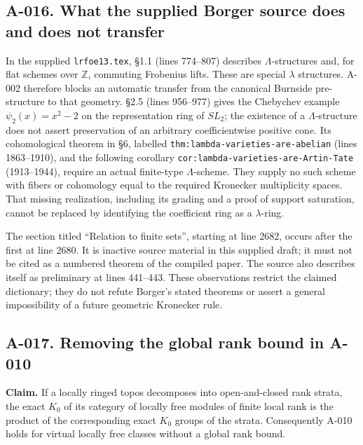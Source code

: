 \subsection*{A-016. What the supplied Borger source does and does not transfer}
In the supplied \texttt{lrfoe13.tex}, \S1.1 (lines 774--807)
describes $\Lambda$-structures and, for flat schemes over
$\mathbb Z$, commuting Frobenius lifts. These are special
$\lambda$ structures. A-002 therefore blocks an automatic transfer
from the canonical Burnside pre-structure to that geometry.
\S2.5 (lines 956--977) gives the Chebychev example
$\psi_2(x)=x^2-2$ on the representation ring of $SL_2$;
the existence of a $\Lambda$-structure does not assert preservation
of an arbitrary coefficientwise positive cone. Its cohomological
theorem in \S6, labelled
\texttt{thm:lambda-varieties-are-abelian} (lines 1863--1910), and
the following corollary
\texttt{cor:lambda-varieties-are-Artin-Tate} (1913--1944), require
an actual finite-type $\Lambda$-scheme. They supply no such scheme
with fibers or cohomology equal to the required Kronecker
multiplicity spaces. That missing realization, including its
grading and a proof of support saturation, cannot be replaced
by identifying the coefficient ring as a $\lambda$-ring.

The section titled ``Relation to finite sets'', starting at line
2682, occurs after the first \verb|| at line 2680.
It is inactive source material in this supplied draft; it must
not be cited as a numbered theorem of the compiled paper. The
source also describes itself as preliminary at lines 441--443.
These observations restrict the claimed dictionary; they do not
refute Borger's stated theorems or assert a general impossibility
of a future geometric Kronecker rule.

\subsection*{A-017. Removing the global rank bound in A-010}
\textbf{Claim.} If a locally ringed topos decomposes into open-and-closed
rank strata, the exact $K_0$ of its category of locally free modules
of finite local rank is the product of the corresponding exact
$K_0$ groups of the strata. Consequently A-010 holds for virtual
locally free classes without a global rank bound.

